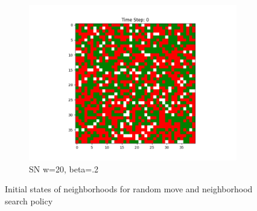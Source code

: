 \documentclass[11pt]{article}
\begin{document}
\begin{figure}[h]
\begin{subfigure}{0.14\textwidth}
			\includegraphics[width=\linewidth]{initial_cluster_w20b20.png}
			\caption{\centering SN w=20, beta=.2}
		\end{subfigure}
		\caption{Initial states of neighborhoods for random move and neighborhood search policy}
	\end{figure}
	\vspace{-1em} %
\end{document}

